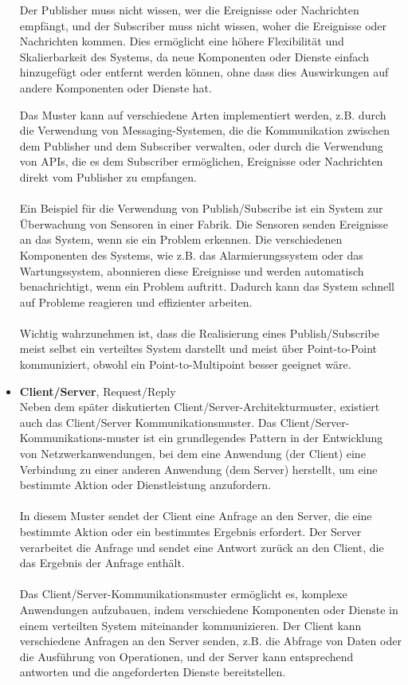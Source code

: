 \begin{itemize}
Der Publisher muss nicht wissen, wer die Ereignisse oder Nachrichten empfängt, und der Subscriber muss nicht wissen, woher die Ereignisse oder Nachrichten kommen. Dies ermöglicht eine höhere Flexibilität und Skalierbarkeit des Systems, da neue Komponenten oder Dienste einfach hinzugefügt oder entfernt werden können, ohne dass dies Auswirkungen auf andere Komponenten oder Dienste hat.

Das Muster kann auf verschiedene Arten implementiert werden, z.B. durch die Verwendung von Messaging-Systemen, die die Kommunikation zwischen dem Publisher und dem Subscriber verwalten, oder durch die Verwendung von APIs, die es dem Subscriber ermöglichen, Ereignisse oder Nachrichten direkt vom Publisher zu empfangen.
\\\\
Ein Beispiel für die Verwendung von Publish/Subscribe ist ein System zur Überwachung von Sensoren in einer Fabrik. Die Sensoren senden Ereignisse an das System, wenn sie ein Problem erkennen. Die verschiedenen Komponenten des Systems, wie z.B. das Alarmierungssystem oder das Wartungssystem, abonnieren diese Ereignisse und werden automatisch benachrichtigt, wenn ein Problem auftritt. Dadurch kann das System schnell auf Probleme reagieren und effizienter arbeiten.
\\\\
Wichtig wahrzunehmen ist, dass die Realisierung eines Publish/Subscribe meist selbst ein verteiltes System darstellt und meist über Point-to-Point kommuniziert, obwohl ein Point-to-Multipoint besser geeignet wäre.
\item \textbf{Client/Server}, Request/Reply\\
Neben dem später diskutierten Client/Server-Architekturmuster, existiert auch das Client/Server Kommunikationsmuster. Das Client/Server-Kommunikations-muster ist ein grundlegendes Pattern in der Entwicklung von Netzwerkanwendungen, bei dem eine Anwendung (der Client) eine Verbindung zu einer anderen Anwendung (dem Server) herstellt, um eine bestimmte Aktion oder Dienstleistung anzufordern.
\\\\
In diesem Muster sendet der Client eine Anfrage an den Server, die eine bestimmte Aktion oder ein bestimmtes Ergebnis erfordert. Der Server verarbeitet die Anfrage und sendet eine Antwort zurück an den Client, die das Ergebnis der Anfrage enthält.
\\\\
Das Client/Server-Kommunikationsmuster ermöglicht es, komplexe Anwendungen aufzubauen, indem verschiedene Komponenten oder Dienste in einem verteilten System miteinander kommunizieren. Der Client kann verschiedene Anfragen an den Server senden, z.B. die Abfrage von Daten oder die Ausführung von Operationen, und der Server kann entsprechend antworten und die angeforderten Dienste bereitstellen.

\end{itemize}
